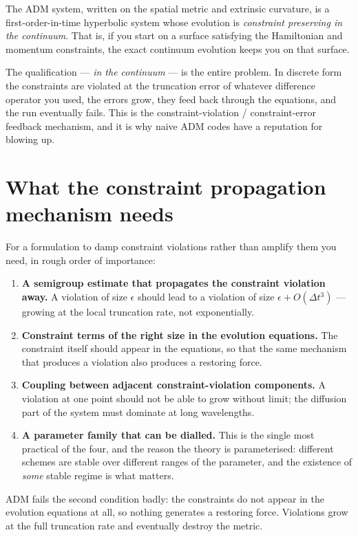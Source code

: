 \documentclass[11pt,openany]{book}
\begin{document}
The ADM system, written on the spatial metric and extrinsic curvature, is a
first-order-in-time hyperbolic system whose evolution is
\emph{constraint preserving in the continuum}. That is, if you start on a
surface satisfying the Hamiltonian and momentum constraints, the exact
continuum evolution keeps you on that surface.

The qualification --- \emph{in the continuum} --- is the entire problem. In
discrete form the constraints are violated at the truncation error of whatever
difference operator you used, the errors grow, they feed back through the
equations, and the run eventually fails. This is the constraint-violation /
constraint-error feedback mechanism, and it is why naive ADM codes have a
reputation for blowing up.

\section{What the constraint propagation mechanism needs}

For a formulation to damp constraint violations rather than amplify them you
need, in rough order of importance:

\begin{enumerate}
\item \textbf{A semigroup estimate that propagates the constraint violation
      away.} A violation of size $\epsilon$ should lead to a violation of
      size $\epsilon + O(\Delta t^3)$ --- growing at the local truncation rate,
      not exponentially.
\item \textbf{Constraint terms of the right size in the evolution equations.}
      The constraint itself should appear in the equations, so that the same
      mechanism that produces a violation also produces a restoring force.
\item \textbf{Coupling between adjacent constraint-violation components.} A
      violation at one point should not be able to grow without limit; the
      diffusion part of the system must dominate at long wavelengths.
\item \textbf{A parameter family that can be dialled.} This is the single most
      practical of the four, and the reason the theory is parameterised:
      different schemes are stable over different ranges of the parameter, and
      the existence of \emph{some} stable regime is what matters.
\end{enumerate}

ADM fails the second condition badly: the constraints do not appear in the
evolution equations at all, so nothing generates a restoring force. Violations
grow at the full truncation rate and eventually destroy the metric.
\end{document}
